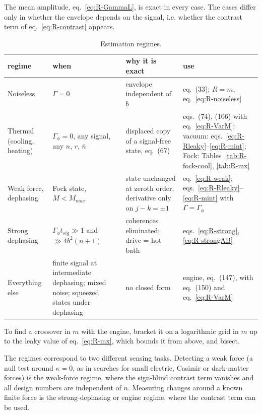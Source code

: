 The mean amplitude, eq.~\eqref{eq:R-GammaL}, is exact in every case. The cases differ only in whether the envelope depends on the signal, i.e. whether the contrast term of eq.~\eqref{eq:R-contrast} appears.

\begin{table}[h]
\centering
\begin{tabular}{p{2.5cm} p{4.0cm} p{4.4cm} p{4.6cm}}
\hline
regime & when & why it is exact & use \\
\hline
Noiseless & $\Gamma = 0$ & envelope independent of $b$ & eq.~(33); $R = m$, eq.~\eqref{eq:R-noiseless} \\
Thermal (cooling, heating) & $\Gamma_\phi = 0$, any signal, any $n$, $r$, $\bar{n}$ & displaced copy of a signal-free state, eq.~(67) & eqs.~(74), (106) with eq.~\eqref{eq:R-VarM}; vacuum: eqs.~\eqref{eq:R-Rleaky}--\eqref{eq:R-mint}; Fock: Tables~\ref{tab:R-fock-cool}, \ref{tab:R-mx} \\
Weak force, dephasing & Fock state, $M < M_{max}$ & state unchanged at zeroth order; derivative only on $j-k=\pm1$ & eq.~\eqref{eq:R-weak}; eqs.~\eqref{eq:R-Rleaky}--\eqref{eq:R-mint} with $\Gamma = \Gamma_\phi$ \\
Strong dephasing & $\Gamma_\phi t_{sig} \gg 1$ and $\gg 4b^2(n+1)$ & coherences eliminated; drive = hot bath & eqs.~\eqref{eq:R-strong}, \eqref{eq:R-strongAB} \\
Everything else & finite signal at intermediate dephasing; mixed noise; squeezed states under dephasing & no closed form & engine, eq.~(147), with eq.~(150) and eq.~\eqref{eq:R-VarM} \\
\hline
\end{tabular}
\caption{Estimation regimes.}
\label{tab:R-regimes}
\end{table}

To find a crossover in $m$ with the engine, bracket it on a logarithmic grid in $m$ up to the leaky value of eq.~\eqref{eq:R-mx}, which bounds it from above, and bisect.

The regimes correspond to two different sensing tasks. Detecting a weak force (a null test around $\kappa = 0$, as in searches for small electric, Casimir or dark-matter forces) is the weak-force regime, where the sign-blind contrast term vanishes and all design numbers are independent of $n$. Measuring changes around a known finite force is the strong-dephasing or engine regime, where the contrast term can be used.

